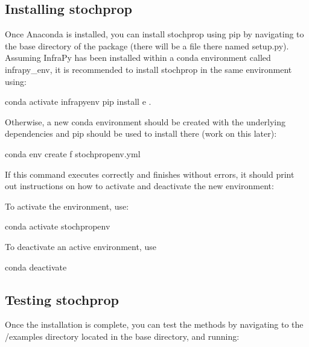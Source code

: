 \documentclass[letterpaper,10pt,english]{sphinxmanual}
\begin{document}
\subsection{Installing stochprop}
\label{\detokenize{installation:installing-stochprop}}
Once Anaconda is installed, you can install stochprop using pip by navigating to the base directory of the package (there will be a file there
named setup.py).  Assuming InfraPy has been installed within a conda environment called infrapy\_env, it is recommended to install stochprop in the same environment using:

\begin{sphinxVerbatim}[commandchars=\\\{\}]
\PYGZgt{}\PYGZgt{} conda activate infrapy\PYGZus{}env
\PYGZgt{}\PYGZgt{} pip install \PYGZhy{}e .
\end{sphinxVerbatim}

Otherwise, a new conda environment should be created with the underlying dependencies and pip should be used to install there (work on this later):

\begin{sphinxVerbatim}[commandchars=\\\{\}]
\PYGZgt{}\PYGZgt{} conda env create \PYGZhy{}f stochprop\PYGZus{}env.yml
\end{sphinxVerbatim}

If this command executes correctly and finishes without errors, it should print out instructions on how to activate and deactivate the new environment:

To activate the environment, use:

\begin{sphinxVerbatim}[commandchars=\\\{\}]
\PYGZgt{}\PYGZgt{} conda activate stochprop\PYGZus{}env
\end{sphinxVerbatim}

To deactivate an active environment, use

\begin{sphinxVerbatim}[commandchars=\\\{\}]
\PYGZgt{}\PYGZgt{} conda deactivate
\end{sphinxVerbatim}


\subsection{Testing stochprop}
\label{\detokenize{installation:testing-stochprop}}
Once the installation is complete, you can test the methods by navigating to the /examples directory located in the base directory, and running:
\end{document}
